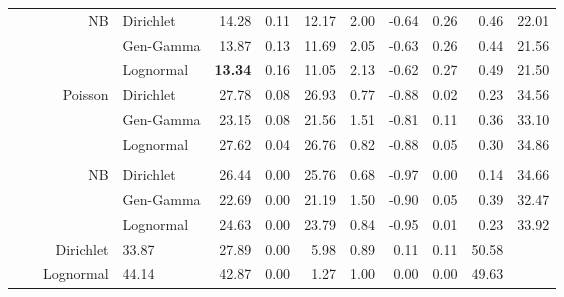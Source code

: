\documentclass[12pt]{article}
\begin{document}
\begin{table}[!htb]
\begin{tabular}{>{\raggedleft\arraybackslash}p{0.40in} | >{\raggedleft\arraybackslash}p{0.45in} | r | >{\raggedleft\arraybackslash}p{0.85in} | r r r r r r r r}
\\
 
& & \multirow{3}{*}{NB}
& \cellcolor{delayC!25}Dirichlet      & 14.28  & 0.11  & 12.17 & 2.00  & -0.64 & 0.26 & 0.46 & 22.01 \\
& & & \cellcolor{delayB!25}Gen-Gamma   & 13.87  & 0.13  & 11.69 & 2.05  & -0.63 & 0.26 & 0.44 & 21.56 \\
& & & \cellcolor{delayA!25}Lognormal   & \bf 13.34 & 0.16 & 11.05 & 2.13 & -0.62 & 0.27 & 0.49 & 21.50 \\
 
\midrule
 
& \multirow{7}{*}{SIR}
 
& \multirow{3}{*}{Poisson}
& \cellcolor{delayC!25}Dirichlet      & 27.78  & 0.08  & 26.93 & 0.77  & -0.88 & 0.02 & 0.23 & 34.56 \\
& & & \cellcolor{delayB!25}Gen-Gamma   & 23.15  & 0.08  & 21.56 & 1.51  & -0.81 & 0.11 & 0.36 & 33.10 \\
& & & \cellcolor{delayA!25}Lognormal   & 27.62  & 0.04  & 26.76 & 0.82  & -0.88 & 0.05 & 0.30 & 34.86 \\
 
\\
 
& & \multirow{3}{*}{NB}
& \cellcolor{delayC!25}Dirichlet      & 26.44  & 0.00  & 25.76 & 0.68  & -0.97 & 0.00 & 0.14 & 34.66 \\
& & & \cellcolor{delayB!25}Gen-Gamma   & 22.69  & 0.00  & 21.19 & 1.50  & -0.90 & 0.05 & 0.39 & 32.47 \\
& & & \cellcolor{delayA!25}Lognormal   & 24.63  & 0.00  & 23.79 & 0.84  & -0.95 & 0.01 & 0.23 & 33.92 \\
 
\midrule
 
& \multicolumn{2}{c|}{\cellcolor{nobbs!40}NobBS}
& \cellcolor{nobbs!40}Dirichlet       & \cellcolor{nobbs!40}33.87 & \cellcolor{nobbs!40}27.89 & \cellcolor{nobbs!40}0.00 & \cellcolor{nobbs!40}5.98 & \cellcolor{nobbs!40}0.89 & \cellcolor{nobbs!40}0.11 & \cellcolor{nobbs!40}0.11 & \cellcolor{nobbs!40}50.58 \\
 
& \multicolumn{2}{c|}{\cellcolor{epincast!40}Epinowcast (default)}
& \cellcolor{epincast!40}Lognormal     & \cellcolor{epincast!40}44.14 & \cellcolor{epincast!40}42.87 & \cellcolor{epincast!40}0.00 & \cellcolor{epincast!40}1.27 & \cellcolor{epincast!40}1.00 & \cellcolor{epincast!40}0.00 & \cellcolor{epincast!40}0.00 & \cellcolor{epincast!40}49.63 \\
 

\end{tabular}
\end{table}
\end{document}
